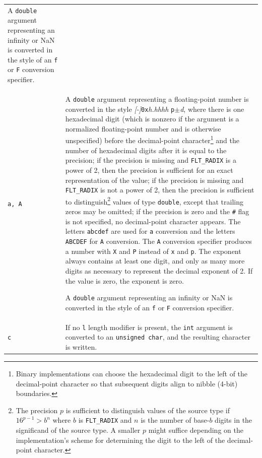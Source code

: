 \begin{longtable}{p{}p{}}
A \texttt{double} argument representing an infinity or NaN is converted in the style
of an \texttt{f} or \texttt{F} conversion specifier.\\
\texttt{a, A}&A \texttt{double} argument representing a floating-point number
is converted in the style \textit{[-]}\texttt{0x}\textit{h.hhhh}
\texttt{p}$\pm$\textit{d}, where there is one hexadecimal digit (which is 
nonzero if the argument is a normalized floating-point number and is
otherwise unspecified) before the decimal-point character\footnote{Binary
  implementations can choose the hexadecimal digit to the left of the
  decimal-point character so that subsequent digits align to nibble (4-bit)
  boundaries.} and the number of hexadecimal digits after it is equal to the
precision; if the precision is missing and \texttt{FLT\_RADIX} is a power of 2,
then the precision is sufficient for an exact representation of the value; if
the precision is missing and \texttt{FLT\_RADIX} is not a power of 2, then the
precision is sufficient to distinguish\footnote{The precision $p$ is sufficient
  to distinguish values of the source type if $16^{p-1} > b^n$ where $b$ is 
\texttt{FLT\_RADIX} and $n$ is the number of base-$b$ digits in the significand
of the source type. A smaller $p$ might suffice depending on the
implementation's scheme for determining the digit to the left of the 
decimal-point character.} values of type \texttt{double}, except that trailing
zeros may be omitted; if the precision is zero and the \texttt{\#} flag is not
specified, no decimal-point character appears. The letters \texttt{abcdef} are
used for \texttt{a} conversion and the letters \texttt{ABCDEF} for \texttt{A}
conversion. The \texttt{A} conversion specifier produces a number with
\texttt{X} and \texttt{P} instead of \texttt{x} and \texttt{p}. The exponent
always contains at least one digit, and only as many more digits as necessary
to represent the decimal exponent of 2. If the value is zero, the exponent is
zero.

A \texttt{double} argument representing an infinity or NaN is converted in the
style of an \texttt{f} or \texttt{F} conversion specifier.\\
\texttt{c}&If no \texttt{l} length modifier is present, the \texttt{int}
argument is converted to an \texttt{unsigned char}, and the resulting character
is written.


\end{longtable}
